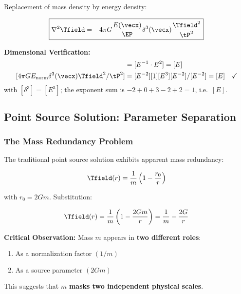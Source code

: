 	Replacement of mass density by energy density:
	
	\begin{equation}
		\boxed{\nabla^2 \Tfield = -4\pi G \frac{E(\vecx)}{\EP} \delta^3(\vecx) \frac{\Tfield^2}{\tP^2}}
		\label{eq:field_equation_mass_free}
	\end{equation}
	
	\textbf{Dimensional Verification:}
	\begin{align}
		[\nabla^2 \Tfield] &= [E^{-1} \cdot E^2] = [E] \\
		[4\pi G E_{\text{norm}} \delta^3(\vecx) \Tfield^2/\tP^2] &= [E^{-2}][1][E^3][E^{-2}]/[E^{-2}] = [E] \quad \checkmark
	\end{align}
	with $[\delta^3]=[E^3]$; the exponent sum is $-2+0+3-2+2=1$, i.e.\ $[E]$.
	
	\subsection{Point Source Solution: Parameter Separation}
	\label{subsec:point_source_elimination}
	
	\subsubsection{The Mass Redundancy Problem}
	
	The traditional point source solution exhibits apparent mass redundancy:
	
	\begin{equation}
		\Tfield(r) = \frac{1}{m}\left(1 - \frac{r_0}{r}\right)
		\label{eq:point_source_original}
	\end{equation}
	
	with $r_0 = 2Gm$. Substitution:
	
	\begin{equation}
		\Tfield(r) = \frac{1}{m}\left(1 - \frac{2Gm}{r}\right) = \frac{1}{m} - \frac{2G}{r}
		\label{eq:mass_redundancy}
	\end{equation}
	
	\textbf{Critical Observation:} Mass $m$ appears in \textbf{two different roles}:
	\begin{enumerate}
		\item As a normalization factor $(1/m)$
		\item As a source parameter $(2Gm)$
	\end{enumerate}
	
	This suggests that $m$ \textbf{masks two independent physical scales}.
	
